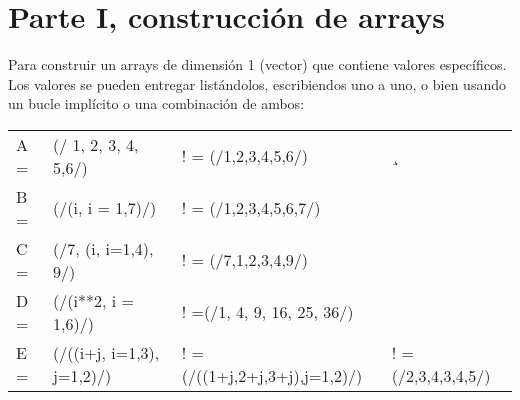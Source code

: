 \documentclass[11pt]{exam}
\begin{document}
\section{Parte I, construcci\'on de arrays}
Para  construir un arrays de dimensi\'on 1 (vector) que contiene valores espec\'ificos. Los valores se pueden entregar list\'andolos, escribiendos uno a uno, o bien usando un bucle impl\'icito o una combinaci\'on de ambos:
\\
\begin{tabular}{llll}
A = &(/ 1, 2, 3, 4, 5,6/) 		&! = (/1,2,3,4,5,6/) &¸\\
B = &(/(i, i = 1,7)/)         		&! = (/1,2,3,4,5,6,7/)&\\
C = &(/7, (i, i=1,4), 9/)     		&! = (/7,1,2,3,4,9/) & \\
D = &(/(i**2, i = 1,6)/)		&! =(/1, 4, 9, 16, 25, 36/) & \\
E = &(/((i+j, i=1,3), j=1,2)/)		&! = (/((1+j,2+j,3+j),j=1,2)/)	&! = (/2,3,4,3,4,5/)\\
 
\end{tabular} 
\end{document}
